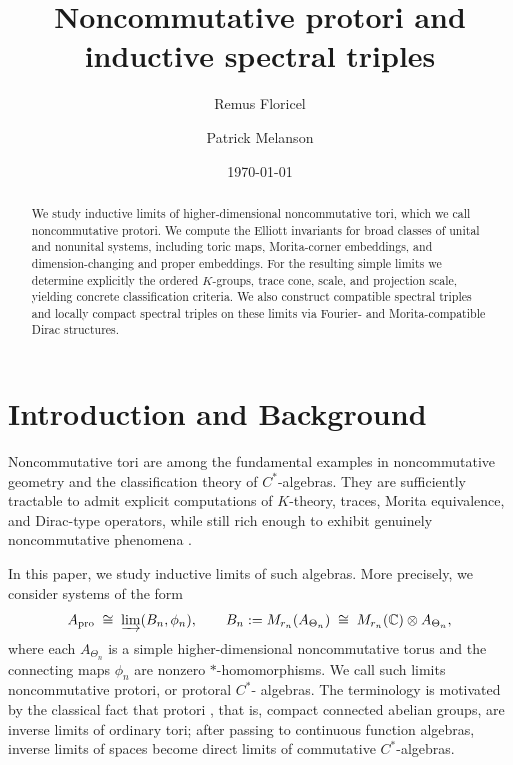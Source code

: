 \documentclass[11pt]{amsart}
\title[Noncommutative protori and inductive spectral triples]{Noncommutative protori and inductive spectral triples}
\author{Remus Floricel}
\author{Patrick Melanson}
\date{\today}
\theoremstyle{definition}
\theoremstyle{remark}
\newcommand{\C}{\mathbb C}
\newcommand{\ex}{\mathrm{pro}}
\begin{document}
\begin{abstract}
We study inductive limits of higher-dimensional noncommutative tori, which we
call noncommutative protori. We compute the Elliott invariants for broad classes
of unital and nonunital systems, including toric maps, Morita-corner embeddings,
and dimension-changing and proper embeddings. For the resulting simple limits we
determine explicitly the ordered $K$-groups, trace cone, scale, and projection
scale, yielding concrete classification criteria. We also construct compatible
spectral triples and locally compact spectral triples on these limits via
Fourier- and Morita-compatible Dirac structures.
\end{abstract}
\maketitle
{\small\tableofcontents}

\section{Introduction and Background}

Noncommutative tori \cite{Rieffel1981,RieffelNC} are among the fundamental
examples in noncommutative geometry \cite{ConnesBook} and the classification theory of
$C^*$-algebras. They are sufficiently tractable to admit explicit
computations of $K$-theory, traces, Morita equivalence, and Dirac-type operators, while still rich enough to exhibit
genuinely noncommutative phenomena \cite{Elliott-Evans, ConnesRieffelYM, CDV1, ConnesTretkoff, FathizadehKhalkhaliScalar, RieffelNC, RieffelSchwarz}.

In this paper, we study inductive limits of such
algebras. More precisely, we consider systems of the form
\[
A_{\ex}\;\cong\;\varinjlim (B_n,\phi_n),\qquad B_n:=M_{r_n}(A_{\Theta_n})\;\cong\;M_{r_n}(\C)\otimes A_{\Theta_n},
\]
where each $A_{\Theta_n}$ is a simple higher-dimensional noncommutative torus
and the connecting maps $\phi_n$ are nonzero $*$-homomorphisms. We call such limits noncommutative protori, or protoral $C^*$-
algebras. The terminology is motivated by the classical fact that protori \cite{HM1, HM2}, that is, compact connected abelian groups, are inverse limits of ordinary tori; after passing to continuous function algebras, inverse limits of spaces become direct limits of commutative $C^*$-algebras.
\end{document}
